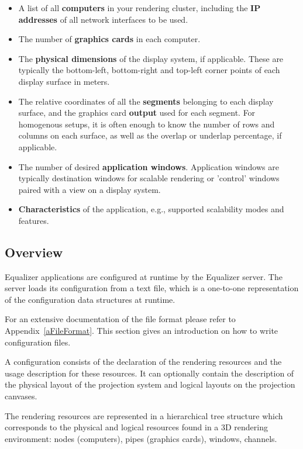 \documentclass[10pt,a4]{scrartcl}
\newcommand{\aref}[1]{Appendix~\ref{#1}}
\begin{document}
\begin{itemize}
\item A list of all \textbf{computers} in your rendering cluster,
  including the \textbf{IP addresses} of all network interfaces to be
  used.
\item The number of \textbf{graphics cards} in each computer.
\item The \textbf{physical dimensions} of the display system, if
  applicable. These are typically the bottom-left, bottom-right and
  top-left corner points of each display surface in meters.
\item The relative coordinates of all the \textbf{segments} belonging to
  each display surface, and the graphics card \textbf{output} used for
  each segment. For homogenous setups, it is often enough to know the
  number of rows and columns on each surface, as well as the overlap or
  underlap percentage, if applicable.
\item The number of desired \textbf{application windows}. Application
  windows are typically destination windows for scalable rendering or
  'control' windows paired with a view on a display system.
\item \textbf{Characteristics} of the application, e.g., supported
  scalability modes and features.
\end{itemize}

\subsection{Overview}

Equalizer applications are configured at runtime by the Equalizer
server. The server loads its configuration from a text file, which is a
one-to-one representation of the configuration data structures at
runtime.

For an extensive documentation of the file format please refer to
\aref{aFileFormat}. This section gives an introduction on how to write
configuration files.

A configuration consists of the declaration of the rendering resources
and the usage description for these resources. It can optionally contain
the description of the physical layout of the projection system and
logical layouts on the projection canvases.

The rendering resources are represented in a hierarchical tree structure
which corresponds to the physical and logical resources found in a 3D
rendering environment: nodes (computers), pipes (graphics cards),
windows, channels. 
\end{document}
